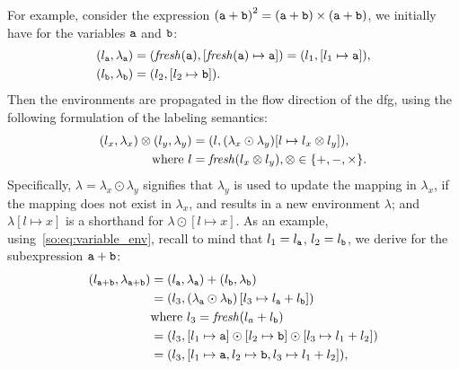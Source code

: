 For example, consider the expression ${(\texttt{a} + \texttt{b})}^2 = (\texttt{a} + \texttt{b})
\times (\texttt{a} + \texttt{b})$, we initially have for the variables $\texttt{a}$ and
$\texttt{b}$:
\begin{equation}
    \begin{aligned}
        (l_{\texttt{a}}, \lambda_{\texttt{a}})
            &= (\operatorname{\mathit{fresh}}(\texttt{a}), [\operatorname{\mathit{fresh}}(\texttt{a})\mapsto{\texttt{a}}])
             = (l_1, [l_1 \mapsto \texttt{a}]), \\
        (l_{\texttt{b}}, \lambda_{\texttt{b}}) &= (l_2, [l_2 \mapsto \texttt{b}]).
    \end{aligned}
    \label{so:eq:variable_env}
\end{equation}
Then the environments are propagated in the flow direction of the \gls{dfg},
using the following formulation of the labeling semantics:
\begin{equation}
    \begin{aligned}
        (l_x, \lambda_x) \otimes (l_y, \lambda_y)
            &= (l, (\lambda_x\odot\lambda_y)
                      [l\mapsto{l_x \otimes l_y}]), \\
            \text{where~} l &= \operatorname{\mathit{fresh}}(l_x \otimes l_y),
                          \otimes\in\{+, -, \times\}.
    \end{aligned}
    \label{so:eq:labeling_semantics}
\end{equation}
Specifically, $\lambda=\lambda_x\odot\lambda_y$ signifies that $\lambda_y$
is used to update the mapping in $\lambda_x$, if the mapping does not
exist in $\lambda_x$, and results in a new environment $\lambda$; and
$\lambda[l\mapsto{x}]$ is a shorthand for $\lambda\odot[l\mapsto{x}]$.  As an
example, using~\eqref{so:eq:variable_env}, recall to mind that $l_1 = l_{\texttt{a}}$,
$l_2 = l_{\texttt{b}}$, we derive for the subexpression $\texttt{a} + \texttt{b}$:
\begin{equation}
    \begin{aligned}
        (l_{\texttt{a} + \texttt{b}}, \lambda_{\texttt{a} + \texttt{b}})
            &= (l_{\texttt{a}}, \lambda_{\texttt{a}}) + (l_{\texttt{b}}, \lambda_{\texttt{b}}) \\
            &= \left(l_3,
                \left( \lambda_{\texttt{a}} \odot \lambda_{\texttt{b}} \right)
                    \left[ l_3\mapsto{l_{\texttt{a}}+ l_{\texttt{b}}} \right]
               \right) \\
            &  \text{where~} l_3 = \operatorname{\mathit{fresh}}(l_a + l_{\texttt{b}}) \\
            &= (l_3, [l_1\mapsto{\texttt{a}}]\odot
                     [l_2\mapsto{\texttt{b}}]\odot
                     [l_3\mapsto{l_1 + l_2}]) \\
            &= (l_3, [
                 l_1\mapsto{\texttt{a}},
                 l_2\mapsto{\texttt{b}},
                 l_3\mapsto{l_1 + l_2}
               ]),
    \end{aligned}
\end{equation}
